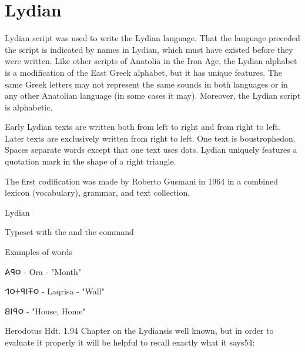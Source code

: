 

\section{Lydian}
\label{sec:lydian}
 Lydian script was used to write the Lydian language. That the language preceded the script is indicated by names in Lydian, which must have existed before they were written. Like other scripts of Anatolia in the Iron Age, the Lydian alphabet is a modification of the East Greek alphabet, but it has unique features. The same Greek letters may not represent the same sounds in both languages or in any other Anatolian language (in some cases it may). Moreover, the Lydian script is alphabetic.



Early Lydian texts are written both from left to right and from right to left. Later texts are exclusively written from right to left. One text is boustrophedon. Spaces separate words except that one text uses dots. Lydian uniquely features a quotation mark in the shape of a right triangle.

The first codification was made by Roberto Gusmani in 1964 in a combined lexicon (vocabulary), grammar, and text collection.

\begin{scriptexample}[]{Lydian}

\medskip

Typeset with the  and the command \cmd{\lydian}
\end{scriptexample}

Examples of words

\bgroup\lydian
𐤬𐤭𐤠  - Ora - "Month"

𐤬𐤳𐤦𐤭𐤲𐤬𐤩  - Laqrisa - "Wall"

𐤬𐤭𐤦𐤡  - "House, Home"

\egroup

Herodotus Hdt. 1.94 
Chapter on the Lydiansis well known, but in order to evaluate it properly it will be
helpful to recall exactly what it says54:

